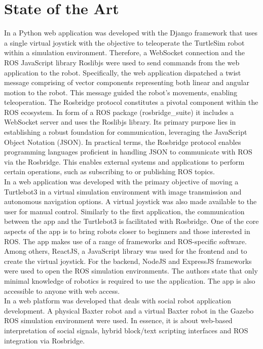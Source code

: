 \documentclass[conference]{IEEEtran}
\begin{document}
\section{State of the Art}
In \cite{kapic} a Python web application was developed with the Django framework that uses a single virtual joystick with the objective to teleoperate the TurtleSim robot within a simulation environment. 
Therefore, a WebSocket connection and the ROS JavaScript library Roslibjs were used to send commands from the web application to the robot. Specifically, the web application dispatched a twist message comprising of vector components representing both linear and angular motion to the robot. This message guided the robot's movements, enabling teleoperation.
The Rosbridge protocol constitutes a pivotal component within the ROS ecosystem. In form of a ROS package (rosbridge\_suite) it includes a WebSocket server and uses the Roslibjs library. Its primary purpose lies in establishing a robust foundation for communication, leveraging the JavaScript Object Notation (JSON).
In practical terms, the Rosbridge protocol enables programming languages proficient in handling JSON to communicate with ROS via the Rosbridge. 
This enables external systems and applications to perform certain operations, such as subscribing to or publishing ROS topics. \cite{rosbridgeOkState,rosbridgeSuite}\\
In \cite{dinodi} a web application was developed with the primary objective of moving a Turtlebot3 in a virtual simulation environment with image transmission and autonomous navigation options. A virtual joystick was also made available to the user for manual control. Similarly to the first application, the communication between the app and the Turtlebot3 is facilitated with Rosbridge. 
One of the core aspects of the app is to bring robots closer to beginners and those interested in ROS. 
The app makes use of a range of frameworks and ROS-specific software. Among others, ReactJS, a JavaScript library was used for the frontend and to create the virtual joystick. For the backend, NodeJS and ExpressJS frameworks were used to open the ROS simulation environments. 
The authors state that only minimal knowledge of robotics is required to use the application. The app is also accessible to anyone with web access.\\
In \cite{johnson} a web platform was developed that deals with social robot application development. A physical Baxter robot and a virtual Baxter robot in the Gazebo ROS simulation environment were used. In essence, it is about web-based interpretation of social signals, hybrid block/text scripting interfaces and ROS integration via Rosbridge. 
\end{document}
